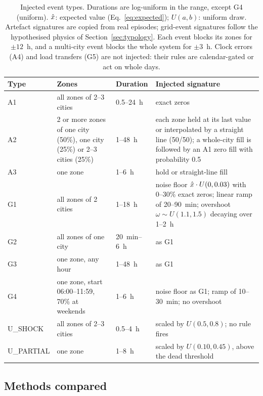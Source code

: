 \begin{table}[htbp]
\centering
\caption{Injected event types. Durations are log-uniform in the range, except G4 (uniform). $\xh$: expected value (Eq.~\eqref{eq:expected}); $U(a,b)$: uniform draw. Artefact signatures are copied from real episodes; grid-event signatures follow the hypothesised physics of Section~\ref{sec:typology}. Each event blocks its zones for $\pm 12$~h, and a multi-city event blocks the whole system for $\pm 3$~h. Clock errors (A4) and load transfers (G5) are not injected: their rules are calendar-gated or act on whole days.}
\label{tab:injection}
\footnotesize
\setlength{\tabcolsep}{4pt}
\begin{tabularx}{\textwidth}{@{}l L{3.6cm} l Y@{}}
\toprule
Type & Zones & Duration & Injected signature \\
\midrule
A1 & all zones of 2--3 cities & 0.5--24~h & exact zeros \\
A2 & 2 or more zones of one city (50\%), one city (25\%) or 2--3 cities (25\%) & 1--48~h & each zone held at its last value or interpolated by a straight line (50/50); a whole-city fill is followed by an A1 zero fill with probability 0.5 \\
A3 & one zone & 1--6~h & hold or straight-line fill \\
\midrule
G1 & all zones of 2 cities & 1--18~h & noise floor $\hat{x} \cdot U(0, 0.03)$ with 0--30\% exact zeros; linear ramp of 20--90~min; overshoot $\omega \sim U(1.1, 1.5)$ decaying over 1--2~h \\
G2 & all zones of one city & 20~min--6~h & as G1 \\
G3 & one zone, any hour & 1--48~h & as G1 \\
G4 & one zone, start 06:00--11:59, 70\% at weekends & 1--6~h & noise floor as G1; ramp of 10--30~min; no overshoot \\
\midrule
U\_SHOCK & all zones of 2--3 cities & 0.5--4~h & scaled by $U(0.5, 0.8)$; no rule fires \\
U\_PARTIAL & one zone & 1--8~h & scaled by $U(0.10, 0.45)$, above the dead threshold \\
\bottomrule
\end{tabularx}
\end{table}

\subsection{Methods compared}\label{sec:compared}

